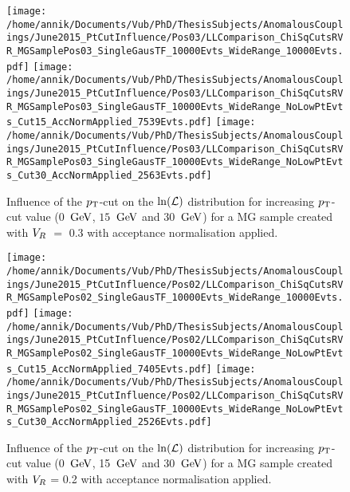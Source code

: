 \begin{figure}[h!t]
 \centering
 \texttt{[image: /home/annik/Documents/Vub/PhD/ThesisSubjects/AnomalousCouplings/June2015\_PtCutInfluence/Pos03/LLComparison\_ChiSqCutsRVR\_MGSamplePos03\_SingleGausTF\_10000Evts\_WideRange\_10000Evts.pdf]}
 \texttt{[image: /home/annik/Documents/Vub/PhD/ThesisSubjects/AnomalousCouplings/June2015\_PtCutInfluence/Pos03/LLComparison\_ChiSqCutsRVR\_MGSamplePos03\_SingleGausTF\_10000Evts\_WideRange\_NoLowPtEvts\_Cut15\_AccNormApplied\_7539Evts.pdf]}
 \texttt{[image: /home/annik/Documents/Vub/PhD/ThesisSubjects/AnomalousCouplings/June2015\_PtCutInfluence/Pos03/LLComparison\_ChiSqCutsRVR\_MGSamplePos03\_SingleGausTF\_10000Evts\_WideRange\_NoLowPtEvts\_Cut30\_AccNormApplied\_2563Evts.pdf]}
 \caption{Influence of the $p_{\textrm T}$-cut on the $\ln(\mathcal{L})$ distribution for increasing $p_{\textrm T}$-cut value ($0$ $\, \mathrm{GeV}$, $15$ $\, \mathrm{GeV}$ and $30$ $\, \mathrm{GeV}$) for a MG sample created with $V_{R}$ $=$ $0.3$ with acceptance normalisation applied.}
 \label{fig::AccNormPos03}
\end{figure}

\begin{figure}[h!t]
 \centering
 \texttt{[image: /home/annik/Documents/Vub/PhD/ThesisSubjects/AnomalousCouplings/June2015\_PtCutInfluence/Pos02/LLComparison\_ChiSqCutsRVR\_MGSamplePos02\_SingleGausTF\_10000Evts\_WideRange\_10000Evts.pdf]}
 \texttt{[image: /home/annik/Documents/Vub/PhD/ThesisSubjects/AnomalousCouplings/June2015\_PtCutInfluence/Pos02/LLComparison\_ChiSqCutsRVR\_MGSamplePos02\_SingleGausTF\_10000Evts\_WideRange\_NoLowPtEvts\_Cut15\_AccNormApplied\_7405Evts.pdf]}
 \texttt{[image: /home/annik/Documents/Vub/PhD/ThesisSubjects/AnomalousCouplings/June2015\_PtCutInfluence/Pos02/LLComparison\_ChiSqCutsRVR\_MGSamplePos02\_SingleGausTF\_10000Evts\_WideRange\_NoLowPtEvts\_Cut30\_AccNormApplied\_2526Evts.pdf]}
 \caption{Influence of the $p_{\textrm T}$-cut on the $\ln(\mathcal{L})$ distribution for increasing $p_{\textrm T}$-cut value (0 $\, \mathrm{GeV}$, 15 $\, \mathrm{GeV}$ and 30 $\, \mathrm{GeV}$) for a MG sample created with $V_{R}$ = 0.2 with acceptance normalisation applied.}
 \label{fig::AccNormPos02}
\end{figure}


